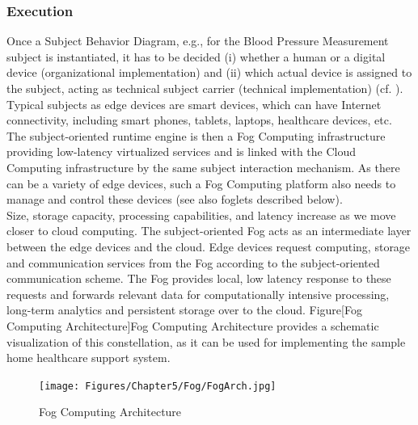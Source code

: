 \subsubsection{Execution}
Once a Subject Behavior Diagram, e.g., for the Blood Pressure Measurement subject is instantiated, it has to be decided (i) whether a human or a digital device (organizational implementation) and (ii) which actual device is assigned to the subject, acting as technical subject carrier (technical implementation) (cf. \cite{Flei12}). Typical subjects as edge devices are smart devices, which can have Internet connectivity, including smart phones, tablets, laptops, healthcare devices, etc. The subject-oriented runtime engine \cite{article:StakeHolderCentered} is then a Fog Computing infrastructure providing low-latency virtualized services and is linked with the Cloud Computing infrastructure by the same subject interaction mechanism. As there can be a variety of edge devices, such a Fog Computing platform also needs to manage and control these devices (see also foglets described below).
\\
Size, storage capacity, processing capabilities, and latency increase as we move closer to cloud computing. The subject-oriented Fog acts as an intermediate layer between the edge devices and the cloud. Edge devices request computing, storage and communication services from the Fog according to the subject-oriented communication scheme. The Fog provides local, low latency response to these requests and forwards relevant data for computationally intensive processing, long-term analytics and persistent storage over to the cloud. Figure[Fog Computing Architecture]{Fog Computing Architecture} provides a schematic visualization of this constellation, as it can be used for implementing the sample home healthcare support system.

\begin{figure}[htbp]
	\centering
	\texttt{[image: Figures/Chapter5/Fog/FogArch.jpg]}
	\caption[Fog Computing Architecture]{Fog Computing Architecture}
	\label{fig:FogArch}
\end{figure}

